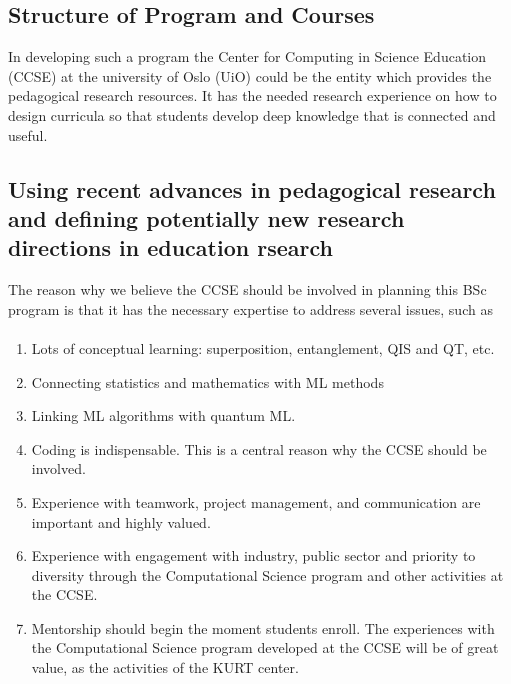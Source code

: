 \documentclass[%
oneside,                 %
final,                   %
10pt]{article}
\begin{document}
\noindent



\subsection*{Structure of Program and Courses}

In developing such a program 
the Center for Computing in Science Education (CCSE) at the university of Oslo (UiO) could be the entity which provides the pedagogical research resources. It has the needed research experience
on how to design curricula so that students develop deep knowledge that is connected and useful.

\subsection*{Using recent advances in pedagogical research and defining potentially new research directions in education rsearch}

The reason why we believe the CCSE should be involved in planning this BSc program is that it has the necessary expertise to address several issues, such as


\paragraph{}
\begin{enumerate}
\item Lots of conceptual learning: superposition, entanglement, QIS and QT, etc. 

\item Connecting statistics and mathematics with ML methods

\item Linking ML algorithms with quantum ML.

\item Coding is indispensable. This is a central reason why the CCSE should be involved.

\item Experience with teamwork, project management, and communication are important and highly valued.

\item Experience with engagement with industry, public sector and priority to diversity through the Computational Science program and other activities at the CCSE.

\item Mentorship should begin the moment students enroll. The experiences with the Computational Science program developed at the CCSE will be of great value, as the activities of the KURT center.
\end{enumerate}
\end{document}
